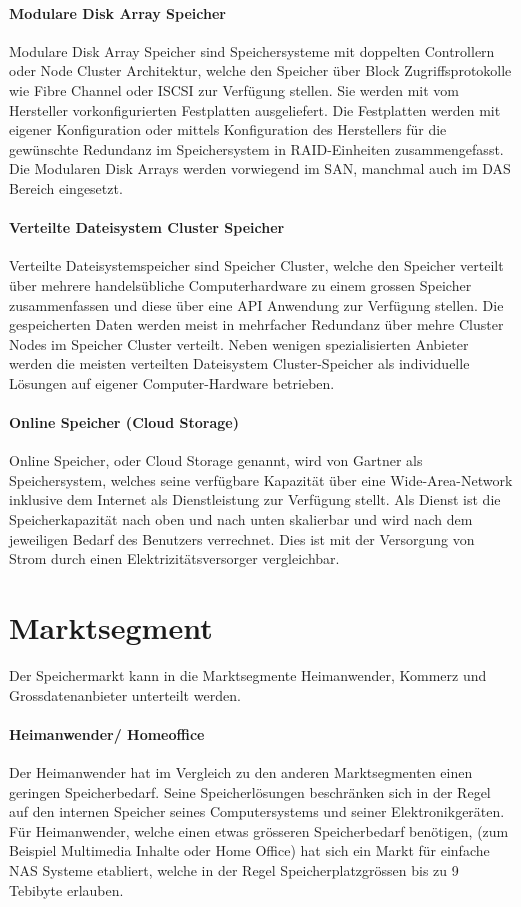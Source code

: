\paragraph*{Modulare Disk Array Speicher}
Modulare Disk Array Speicher sind Speichersysteme mit doppelten Controllern oder Node Cluster Architektur, welche den Speicher über Block Zugriffsprotokolle wie Fibre Channel oder ISCSI zur Verfügung stellen. Sie werden mit vom Hersteller vorkonfigurierten Festplatten ausgeliefert. Die Festplatten werden mit eigener Konfiguration oder mittels Konfiguration des Herstellers für die gewünschte Redundanz im Speichersystem in RAID-Einheiten zusammengefasst. Die Modularen Disk Arrays werden vorwiegend im SAN, manchmal auch im DAS Bereich eingesetzt.

\paragraph*{Verteilte Dateisystem Cluster Speicher}
Verteilte Dateisystemspeicher sind Speicher Cluster, welche den Speicher verteilt über mehrere handelsübliche Computerhardware zu einem grossen Speicher zusammenfassen und diese über eine API Anwendung zur Verfügung stellen. Die gespeicherten Daten werden meist in mehrfacher Redundanz über mehre Cluster Nodes im Speicher Cluster verteilt. Neben wenigen spezialisierten Anbieter werden die meisten verteilten Dateisystem Cluster-Speicher als individuelle Lösungen auf eigener Computer-Hardware betrieben.

\paragraph*{Online Speicher (Cloud Storage)}
Online Speicher, oder Cloud Storage genannt, wird von Gartner als Speichersystem, welches seine verfügbare Kapazität über eine Wide-Area-Network inklusive dem Internet als Dienstleistung zur Verfügung stellt. Als Dienst ist die Speicherkapazität nach oben und nach unten skalierbar und wird nach dem jeweiligen Bedarf des Benutzers verrechnet. Dies ist mit der Versorgung von Strom durch einen Elektrizitätsversorger vergleichbar. \cite{AdamW.Couture2010}

\section{Marktsegment}
Der Speichermarkt kann in die Marktsegmente Heimanwender, Kommerz und Grossdatenanbieter unterteilt werden.

\paragraph*{Heimanwender/ Homeoffice} 
Der Heimanwender hat im Vergleich zu den anderen Marktsegmenten einen geringen Speicherbedarf. Seine Speicherlösungen beschränken sich in der Regel auf den internen Speicher seines Computersystems und seiner Elektronikgeräten. Für Heimanwender, welche einen etwas grösseren Speicherbedarf benötigen, (zum Beispiel Multimedia Inhalte oder Home Office) hat sich ein Markt für einfache NAS Systeme etabliert, welche in der Regel Speicherplatzgrössen bis zu 9 Tebibyte erlauben.


